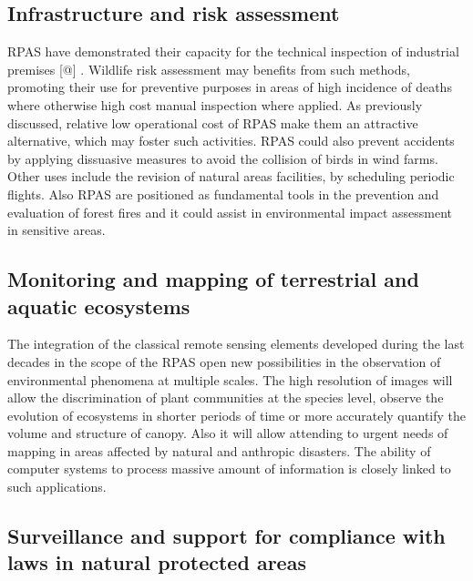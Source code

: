 \documentclass[]{interact}
\theoremstyle{plain}%
\theoremstyle{definition}
\theoremstyle{remark}
\begin{document}
\subsection{Infrastructure and risk
assessment}\label{infrastructure-and-risk-assessment-1}

RPAS have demonstrated their capacity for the technical inspection of
industrial premises {[}@{]} . Wildlife risk assessment may benefits from
such methods, promoting their use for preventive purposes in areas of
high incidence of deaths where otherwise high cost manual inspection
where applied. As previously discussed, relative low operational cost of
RPAS make them an attractive alternative, which may foster such
activities. RPAS could also prevent accidents by applying dissuasive
measures to avoid the collision of birds in wind farms. Other uses
include the revision of natural areas facilities, by scheduling periodic
flights. Also RPAS are positioned as fundamental tools in the prevention
and evaluation of forest fires and it could assist in environmental
impact assessment in sensitive areas.

\subsection{Monitoring and mapping of terrestrial and aquatic
ecosystems}\label{monitoring-and-mapping-of-terrestrial-and-aquatic-ecosystems-1}

The integration of the classical remote sensing elements developed
during the last decades in the scope of the RPAS open new possibilities
in the observation of environmental phenomena at multiple scales. The
high resolution of images will allow the discrimination of plant
communities at the species level, observe the evolution of ecosystems in
shorter periods of time or more accurately quantify the volume and
structure of canopy. Also it will allow attending to urgent needs of
mapping in areas affected by natural and anthropic disasters. The
ability of computer systems to process massive amount of information is
closely linked to such applications.

\subsection{Surveillance and support for compliance with laws in natural
protected
areas}\label{surveillance-and-support-for-compliance-with-laws-in-natural-protected-areas}
\end{document}
